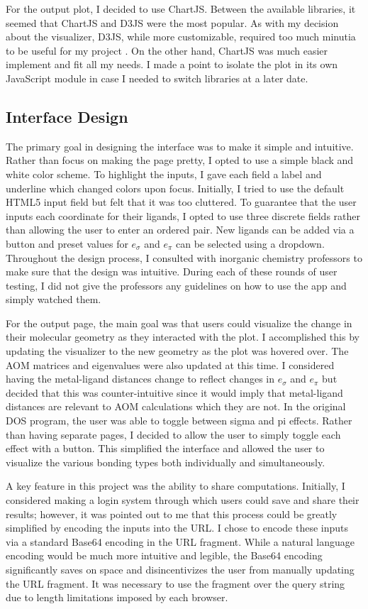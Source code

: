 \documentclass[10pt,twocolumn]{article}
\begin{document}
For the output plot, I decided to use ChartJS. Between the available libraries, it seemed that ChartJS and D3JS were the most popular. As with my decision about the visualizer, D3JS, while more customizable, required too much minutia to be useful for my project \cite{chartjs,d3,d3_vs_chartjs}. On the other hand, ChartJS was much easier implement and fit all my needs. I made a point to isolate the plot in its own JavaScript module in case I needed to switch libraries at a later date. 

\subsection{Interface Design}
The primary goal in designing the interface was to make it simple and intuitive. Rather than focus on making the page pretty, I opted to use a simple black and white color scheme. To highlight the inputs, I gave each field a label and underline which changed colors upon focus. Initially, I tried to use the default HTML5 input field but felt that it was too cluttered. To guarantee that the user inputs each coordinate for their ligands, I opted to use three discrete fields rather than allowing the user to enter an ordered pair. New ligands can be added via a button and preset values for $e_\sigma$ and $e_\pi$ can be selected using a dropdown. Throughout the design process, I consulted with inorganic chemistry professors to make sure that the design was intuitive. During each of these rounds of user testing, I did not give the professors any guidelines on how to use the app and simply watched them.

For the output page, the main goal was that users could visualize the change in their molecular geometry as they interacted with the plot. I accomplished this by updating the visualizer to the new geometry as the plot was hovered over. The AOM matrices and eigenvalues were also updated at this time. I considered having the metal-ligand distances change to reflect changes in $e_\sigma$ and $e_\pi$ but decided that this was counter-intuitive since it would imply that metal-ligand distances are relevant to AOM calculations which they are not. In the original DOS program, the user was able to toggle between sigma and pi effects. Rather than having separate pages, I decided to allow the user to simply toggle each effect with a button. This simplified the interface and allowed the user to visualize the various bonding types both individually and simultaneously.

A key feature in this project was the ability to share computations. Initially, I considered making a login system through which users could save and share their results; however, it was pointed out to me that this process could be greatly simplified by encoding the inputs into the URL. I chose to encode these inputs via a standard Base64 encoding in the URL fragment. While a natural language encoding would be much more intuitive and legible, the Base64 encoding significantly saves on space and disincentivizes the user from manually updating the URL fragment. It was necessary to use the fragment over the query string due to length limitations imposed by each browser. 
\end{document}
